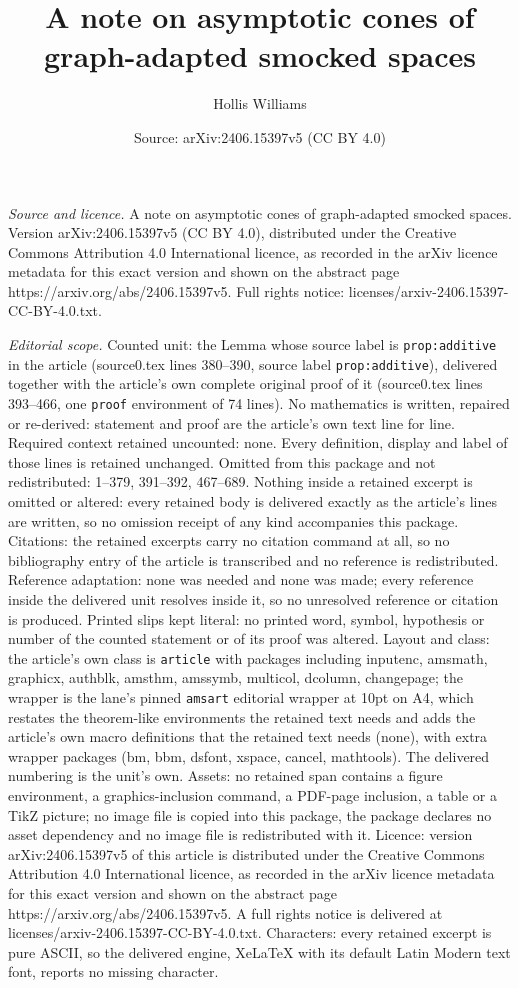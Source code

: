 \documentclass[10pt,a4paper]{amsart}
\title[A note on asymptotic cones of graph-adapted smocked spaces]{A note on asymptotic cones of graph-adapted smocked spaces}
\author{Hollis Williams}
\date{Source: arXiv:2406.15397v5 (CC BY 4.0)}
\begin{document}
\maketitle

\noindent\emph{Source and licence.} A note on asymptotic cones of graph-adapted smocked spaces. Version arXiv:2406.15397v5 (CC BY 4.0), distributed under the Creative Commons Attribution 4.0 International licence, as recorded in the arXiv licence metadata for this exact version and shown on the abstract page https://arxiv.org/abs/2406.15397v5. Full rights notice: licenses/arxiv-2406.15397-CC-BY-4.0.txt.\par\smallskip

\noindent\textit{Editorial scope.} Counted unit: the Lemma whose source label is \texttt{prop:additive} in the article (source0.tex lines 380--390, source label \texttt{prop:additive}), delivered together with the article's own complete original proof of it (source0.tex lines 393--466, one \texttt{proof} environment of 74 lines). No mathematics is written, repaired or re-derived: statement and proof are the article's own text line for line. Required context retained uncounted: none. Every definition, display and label of those lines is retained unchanged. Omitted from this package and not redistributed: 1--379, 391--392, 467--689. Nothing inside a retained excerpt is omitted or altered: every retained body is delivered exactly as the article's lines are written, so no omission receipt of any kind accompanies this package. Citations: the retained excerpts carry no citation command at all, so no bibliography entry of the article is transcribed and no reference is redistributed. Reference adaptation: none was needed and none was made; every reference inside the delivered unit resolves inside it, so no unresolved reference or citation is produced. Printed slips kept literal: no printed word, symbol, hypothesis or number of the counted statement or of its proof was altered. Layout and class: the article's own class is \texttt{article} with packages including inputenc, amsmath, graphicx, authblk, amsthm, amssymb, multicol, dcolumn, changepage; the wrapper is the lane's pinned \texttt{amsart} editorial wrapper at 10pt on A4, which restates the theorem-like environments the retained text needs and adds the article's own macro definitions that the retained text needs (none), with extra wrapper packages (bm, bbm, dsfont, xspace, cancel, mathtools). The delivered numbering is the unit's own. Assets: no retained span contains a figure environment, a graphics-inclusion command, a PDF-page inclusion, a table or a TikZ picture; no image file is copied into this package, the package declares no asset dependency and no image file is redistributed with it. Licence: version arXiv:2406.15397v5 of this article is distributed under the Creative Commons Attribution 4.0 International licence, as recorded in the arXiv licence metadata for this exact version and shown on the abstract page https://arxiv.org/abs/2406.15397v5. A full rights notice is delivered at licenses/arxiv-2406.15397-CC-BY-4.0.txt. Characters: every retained excerpt is pure ASCII, so the delivered engine, XeLaTeX with its default Latin Modern text font, reports no missing character.
\end{document}

